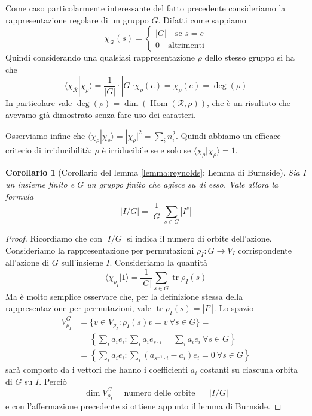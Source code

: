 \documentclass[11pt]{article}
\theoremstyle{plain}
\newtheorem*{cor}{Corollario}
\theoremstyle{definition}
\theoremstyle{remark}
\newcommand{\dsum}{\displaystyle\sum}
\DeclareMathOperator{\tr}{tr}
\DeclareMathOperator{\Hom}{Hom}
\begin{document}
  Come caso particolarmente interessante del fatto precedente consideriamo la rappresentazione regolare di un gruppo $G$. Difatti come sappiamo
    \[ \chi_{\mathcal{R}}(s) =
    \begin{cases}
      |G| \quad \text{se } s = e \\
      0 \quad \text{altrimenti}
    \end{cases}\]
    Quindi considerando una qualsiasi rappresentazione $\rho$ dello stesso gruppo si ha che
    \[ \langle \chi_{\mathcal{R}} | \chi_\rho \rangle = \frac{1}{|G|}\cdot|G|\cdot\chi_{\rho}(e)=\chi_{\rho}(e)=\deg(\rho) \]
    In particolare vale $\deg(\rho)=\dim(\Hom(\mathcal{R},\rho))$,
    che è un risultato che avevamo già dimostrato senza fare uso dei caratteri.

  Osserviamo infine che $\langle \chi_\rho | \chi_\rho \rangle = |\chi_\rho|^2 = \sum_i n_i^2$.
  Quindi abbiamo un efficace criterio di irriducibilità: $\rho$ è irriducibile se e solo se $\langle \chi_\rho | \chi_\rho \rangle = 1$.



\begin{cor}[Corollario del lemma \ref{lemma:reynolds}: Lemma di Burnside]
Sia $I$ un insieme finito e $G$ un gruppo finito che agisce su di esso. Vale allora la formula
\[ |I/G| = \dfrac{1}{|G|} \dsum_{s\in G} |I^s|\]
\end{cor}
\begin{proof}
Ricordiamo che con $|I/G|$ si indica il numero di orbite dell'azione.
Consideriamo la rappresentazione per permutazioni  $\rho_I:G\to V_I$ corrispondente all'azione di $G$ sull'insieme $I$. Consideriamo la quantità
\[\langle \chi_{\rho_I} | 1 \rangle = \dfrac{1}{|G|} \dsum_{s\in G} \tr \rho_I(s)\]
Ma è molto semplice osservare che, per la definizione stessa della rappresentazione per permutazioni, vale $\tr \rho_I(s) = |I^s|$.
Lo spazio
\begin{align*}
V_{\rho_I}^G &= \{v\in V_{\rho_I}:\rho_I(s)v=v\  \forall s\in G\} = \\
&=\left\{\sum_i a_i e_i :\sum_i a_i e_{s\cdot i}=\sum_i a_i e_i\ \forall s\in G \right\}= \\
&=\left\{ \sum_i a_i e_i: \sum_i (a_{s^{-1}\cdot i}-a_i)e_i=0\ \forall s\in G \right\}
\end{align*}
sarà composto da i vettori che hanno i coefficienti $a_i$ costanti su ciascuna orbita di $G$ su $I$. Perciò
\[ \dim V_{\rho_I}^G = \text{numero delle orbite } = |I/G|\]
e con l'affermazione precedente si ottiene appunto il lemma di Burnside.
\end{proof}
\end{document}
